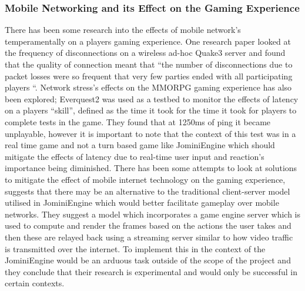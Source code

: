 \documentclass{article}
\begin{document}
	\subsubsection{Mobile Networking and its Effect on the Gaming Experience}
	There has been some research into the effects of mobile network’s temperamentally on a players gaming experience. One research paper\cite{6098224} looked at the frequency of disconnections on a wireless ad-hoc Quake3 server and found that the quality of connection meant that “the number of disconnections due to packet losses were so frequent that very few parties ended with all participating players “. Network stress’s effects on the MMORPG gaming experience has also been explored; Everquest2 was used as a testbed to monitor the effects of latency on a players “skill”, defined as the time it took for the time it took for players to complete tests in the game\cite{Fritsch:2005:ELN:1103599.1103623}. They found that at 1250ms of ping it became unplayable, however it is important to note that the context of this test was in a real time game and not a turn based game like JominiEngine which should mitigate the effects of latency due to real-time user input and reaction’s importance being diminished. There has been some attempts to look at solutions to mitigate the effect of mobile internet technology on the gaming experience\cite{Wang:2012:CMG:2331675.2331679}, suggests that there may be an alternative to the traditional client-server model utilised in JominiEngine which would better facilitate gameplay over mobile networks. They suggest a model which incorporates a game engine server which is used to compute and render the frames based on the actions the user takes and then these are relayed back using a streaming server similar to how video traffic is transmitted over the internet. To implement this in the context of the JominiEngine would be an arduous task outside of the scope of the project and they conclude that their research is experimental and would only be successful in certain contexts.
\end{document}
